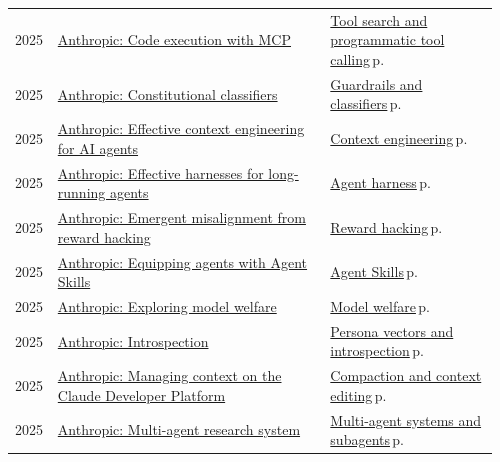 \documentclass[10pt,a4paper,openany]{report}
\begin{document}
{\begin{longtable}{@{}p{0.07\linewidth}>{\raggedright}p{0.55\linewidth}>{\raggedright\arraybackslash}p{0.34\linewidth}@{}}
2025 & \href{https://www.anthropic.com/engineering/code-execution-with-mcp}{Anthropic: Code execution with MCP} & \hyperref[c:agents-6]{Tool search and programmatic tool calling}\,{\color{muted}\scriptsize p.\,\pageref{c:agents-6}}\\
2025 & \href{https://www.anthropic.com/research/constitutional-classifiers}{Anthropic: Constitutional classifiers} & \hyperref[c:safety-5]{Guardrails and classifiers}\,{\color{muted}\scriptsize p.\,\pageref{c:safety-5}}\\
2025 & \href{https://www.anthropic.com/engineering/effective-context-engineering-for-ai-agents}{Anthropic: Effective context engineering for AI agents} & \hyperref[c:context-0]{Context engineering}\,{\color{muted}\scriptsize p.\,\pageref{c:context-0}}\\
2025 & \href{https://www.anthropic.com/engineering/effective-harnesses-for-long-running-agents}{Anthropic: Effective harnesses for long-running agents} & \hyperref[c:agents-0]{Agent harness}\,{\color{muted}\scriptsize p.\,\pageref{c:agents-0}}\\
2025 & \href{https://www.anthropic.com/research/emergent-misalignment-reward-hacking}{Anthropic: Emergent misalignment from reward hacking} & \hyperref[c:reasoning-9]{Reward hacking}\,{\color{muted}\scriptsize p.\,\pageref{c:reasoning-9}}\\
2025 & \href{https://www.anthropic.com/engineering/equipping-agents-for-the-real-world-with-agent-skills}{Anthropic: Equipping agents with Agent Skills} & \hyperref[c:protocols-5]{Agent Skills}\,{\color{muted}\scriptsize p.\,\pageref{c:protocols-5}}\\
2025 & \href{https://www.anthropic.com/research/exploring-model-welfare}{Anthropic: Exploring model welfare} & \hyperref[c:safety-10]{Model welfare}\,{\color{muted}\scriptsize p.\,\pageref{c:safety-10}}\\
2025 & \href{https://www.anthropic.com/research/introspection}{Anthropic: Introspection} & \hyperref[c:safety-7]{Persona vectors and introspection}\,{\color{muted}\scriptsize p.\,\pageref{c:safety-7}}\\
2025 & \href{https://www.anthropic.com/news/context-management}{Anthropic: Managing context on the Claude Developer Platform} & \hyperref[c:context-2]{Compaction and context editing}\,{\color{muted}\scriptsize p.\,\pageref{c:context-2}}\\
2025 & \href{https://www.anthropic.com/engineering/multi-agent-research-system}{Anthropic: Multi-agent research system} & \hyperref[c:agents-7]{Multi-agent systems and subagents}\,{\color{muted}\scriptsize p.\,\pageref{c:agents-7}}\\

\end{longtable}}
\end{document}
